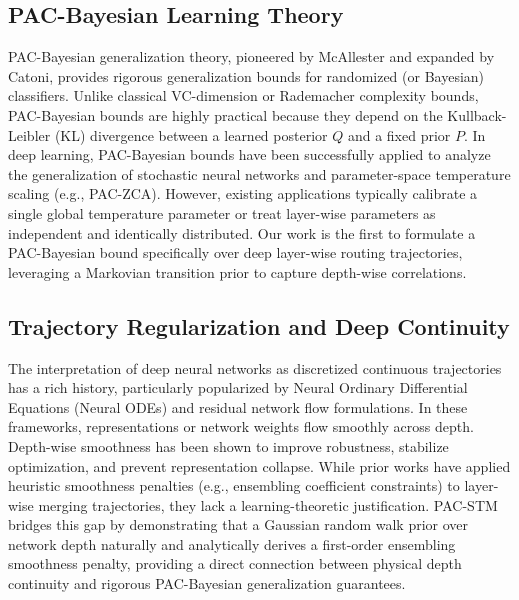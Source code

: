 \subsection{PAC-Bayesian Learning Theory}
PAC-Bayesian generalization theory, pioneered by McAllester \cite{kearns89} and expanded by Catoni, provides rigorous generalization bounds for randomized (or Bayesian) classifiers. Unlike classical VC-dimension or Rademacher complexity bounds, PAC-Bayesian bounds are highly practical because they depend on the Kullback-Leibler (KL) divergence between a learned posterior $Q$ and a fixed prior $P$. 
In deep learning, PAC-Bayesian bounds have been successfully applied to analyze the generalization of stochastic neural networks and parameter-space temperature scaling (e.g., PAC-ZCA). However, existing applications typically calibrate a single global temperature parameter or treat layer-wise parameters as independent and identically distributed. Our work is the first to formulate a PAC-Bayesian bound specifically over deep layer-wise routing trajectories, leveraging a Markovian transition prior to capture depth-wise correlations.

\subsection{Trajectory Regularization and Deep Continuity}
The interpretation of deep neural networks as discretized continuous trajectories has a rich history, particularly popularized by Neural Ordinary Differential Equations (Neural ODEs) and residual network flow formulations. In these frameworks, representations or network weights flow smoothly across depth. Depth-wise smoothness has been shown to improve robustness, stabilize optimization, and prevent representation collapse. 
While prior works have applied heuristic smoothness penalties (e.g., ensembling coefficient constraints) to layer-wise merging trajectories, they lack a learning-theoretic justification. PAC-STM bridges this gap by demonstrating that a Gaussian random walk prior over network depth naturally and analytically derives a first-order ensembling smoothness penalty, providing a direct connection between physical depth continuity and rigorous PAC-Bayesian generalization guarantees.
